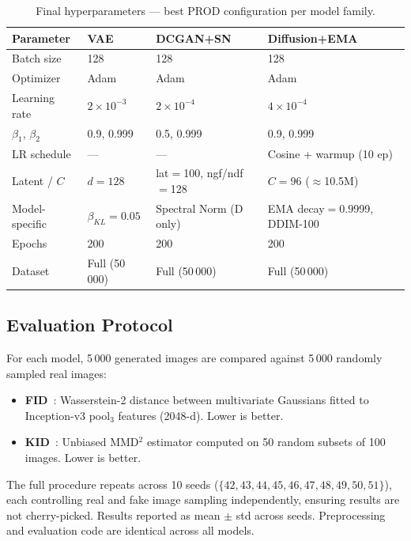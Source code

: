 \documentclass[runningheads]{llncs}
\begin{document}
\begin{table}[htbp]
\caption{Final hyperparameters — best PROD configuration per model family.}\label{tab:hp_all}
\centering
\begin{tabular}{llll}
\toprule
Parameter & VAE & DCGAN+SN & Diffusion+EMA \\
\midrule
Batch size    & 128                    & 128                    & 128 \\
Optimizer     & Adam                   & Adam                   & Adam \\
Learning rate & $2{\times}10^{-3}$     & $2{\times}10^{-4}$     & $4{\times}10^{-4}$ \\
$\beta_1$, $\beta_2$ & 0.9, 0.999      & 0.5, 0.999             & 0.9, 0.999 \\
LR schedule   & —                      & —                      & Cosine + warmup (10 ep) \\
Latent / $C$  & $d=128$                & lat$=$100, ngf/ndf$=$128 & $C=96$ ($\approx$10.5M) \\
Model-specific & $\beta_{KL}=0.05$      & Spectral Norm (D only) & EMA decay$=$0.9999, DDIM-100 \\
Epochs        & 200                    & 200                    & 200 \\
Dataset       & Full (50\,000)         & Full (50\,000)         & Full (50\,000) \\
\bottomrule
\end{tabular}
\end{table}

\subsection{Evaluation Protocol}

For each model, 5\,000 generated images are compared against 5\,000 randomly sampled real images:
\begin{itemize}
    \item \textbf{FID}~\cite{heusel2017}: Wasserstein-2 distance between multivariate Gaussians fitted to Inception-v3 pool$_3$ features (2048-d). Lower is better.
    \item \textbf{KID}~\cite{binkowski2018}: Unbiased MMD$^2$ estimator computed on 50 random subsets of 100 images. Lower is better.
\end{itemize}
The full procedure repeats across 10 seeds ($\{42, 43, 44, 45, 46, 47, 48, 49, 50, 51\}$), each controlling real and fake image sampling independently, ensuring results are not cherry-picked. Results reported as mean $\pm$ std across seeds. Preprocessing and evaluation code are identical across all models. 
\end{document}
